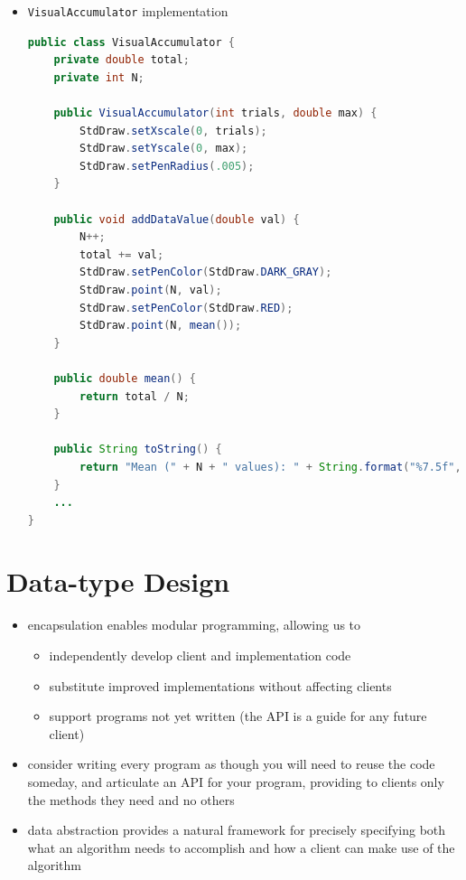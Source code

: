 \documentclass[8pt,a4paper,compress]{beamer}
\begin{document}
\begin{frame}[fragile]
\begin{itemize}
\item \lstinline{VisualAccumulator} implementation
\begin{lstlisting}[language=Java]
public class VisualAccumulator {
    private double total;
    private int N;

    public VisualAccumulator(int trials, double max) {
        StdDraw.setXscale(0, trials);
        StdDraw.setYscale(0, max);
        StdDraw.setPenRadius(.005);
    }

    public void addDataValue(double val) {
        N++;
        total += val;
        StdDraw.setPenColor(StdDraw.DARK_GRAY);
        StdDraw.point(N, val);
        StdDraw.setPenColor(StdDraw.RED);
        StdDraw.point(N, mean());
    }

    public double mean() {
        return total / N;
    }

    public String toString() {
        return "Mean (" + N + " values): " + String.format("%7.5f", mean());
    }
    ...
}
\end{lstlisting}
\end{itemize}
\end{frame}

\section{Data-type Design}
\begin{frame}[fragile]
\begin{itemize}
\item encapsulation enables modular programming, allowing us to
\begin{itemize}
\item independently develop client and implementation code
\item substitute improved implementations without affecting clients
\item support programs not yet written (the API is a guide for any future client)
\end{itemize}

\item consider writing every program as though you
will need to reuse the code someday, and articulate an API for your program, providing to clients only the methods they need and no others

\item data abstraction provides a natural framework for precisely specifying both what an algorithm needs to accomplish and how a client can make use of the algorithm
\end{itemize}
\end{frame}
\end{document}
